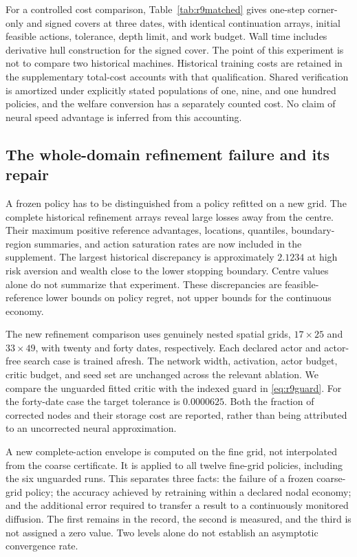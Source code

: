 For a controlled cost comparison, Table~\ref{tab:r9matched} gives one-step corner-only and signed covers at three dates, with identical continuation arrays, initial feasible actions, tolerance, depth limit, and work budget. Wall time includes derivative hull construction for the signed cover. The point of this experiment is not to compare two historical machines. Historical training costs are retained in the supplementary total-cost accounts with that qualification. Shared verification is amortized under explicitly stated populations of one, nine, and one hundred policies, and the welfare conversion has a separately counted cost. No claim of neural speed advantage is inferred from this accounting.


\subsection{The whole-domain refinement failure and its repair}
A frozen policy has to be distinguished from a policy refitted on a new grid. The complete historical refinement arrays reveal large losses away from the centre. Their maximum positive reference advantages, locations, quantiles, boundary-region summaries, and action saturation rates are now included in the supplement. The largest historical discrepancy is approximately $2.1234$ at high risk aversion and wealth close to the lower stopping boundary. Centre values alone do not summarize that experiment. These discrepancies are feasible-reference lower bounds on policy regret, not upper bounds for the continuous economy.

The new refinement comparison uses genuinely nested spatial grids, $17\times25$ and $33\times49$, with twenty and forty dates, respectively. Each declared actor and actor-free search case is trained afresh. The network width, activation, actor budget, critic budget, and seed set are unchanged across the relevant ablation. We compare the unguarded fitted critic with the indexed guard in \eqref{eq:r9guard}. For the forty-date case the target tolerance is $0.0000625$. Both the fraction of corrected nodes and their storage cost are reported, rather than being attributed to an uncorrected neural approximation.

A new complete-action envelope is computed on the fine grid, not interpolated from the coarse certificate. It is applied to all twelve fine-grid policies, including the six unguarded runs. This separates three facts: the failure of a frozen coarse-grid policy; the accuracy achieved by retraining within a declared nodal economy; and the additional error required to transfer a result to a continuously monitored diffusion. The first remains in the record, the second is measured, and the third is not assigned a zero value. Two levels alone do not establish an asymptotic convergence rate.

